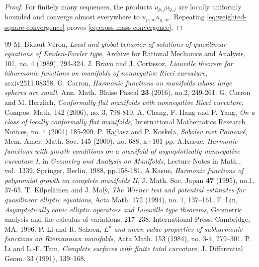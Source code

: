 \documentclass[10pt,a4paper]{amsart}
\numberwithin{equation}{section}
\begin{document}
\begin{proof}
For finitely many sequences, the products
$u_{p,j}u_{q,j}$ are locally uniformly bounded and converge almost
everywhere to $u_{p,\infty}u_{q,\infty}$.  Repeating
\cref{eq:weighted-square-convergence} proves
\cref{eq:cross-mass-convergence}.

\end{proof}


\begin{thebibliography}{99}
 M. Bidaut-V{\'e}ron, \emph{Local and global behavior of solutions of quasilinear equations of Emden-Fowler type}, Archive for Rational Mechanics and Analysis, 107, no. 4 (1989), 293-324.
 J. Bravo and J. Cortissoz, \emph{Liouville theorem for biharmonic functions on manifolds of nonnegative Ricci curvature}, arxiv2511.08358.
 G. Carron, \emph{Harmonic functions on manifolds whose large spheres are small}, Ann. Math. Blaise Pascal \textbf{23} (2016), no.2, 249-261.
 G. Carron and M. Herzlich, \textit{Conformally flat manifolds with nonnegative Ricci curvature}, Compos. Math. 142 (2006), no. 3, 798-810.
 A. Chang, F. Hang and P. Yang, \emph{On a class of locally conformally flat manifolds}, International Mathematics Research Notices, no. 4 (2004) 185-209.
 P. Hajłasz and P. Koskela, \emph{Sobolev met Poincar\'e}, Mem. Amer. Math. Soc. 145 (2000), no. 688, x+101 pp.
 A.Kasue, \emph{Harmonic functions with growth conditions on a manifold of asymptotically nonnegative curvature I}, in \emph{Geometry and Analysis on Manifolds}, Lecture Notes in Math., vol.~1339, Springer, Berlin, 1988, pp.158-181.
 A.Kasue, \emph{Harmonic functions of polynomial growth on complete manifolds II}, J. Math. Soc. Japan \textbf{47} (1995), no.1, 37-65.
 T. Kilpel{\"a}inen and J. Mal{\`y}, \emph{The Wiener test and potential estimates for quasilinear elliptic equations}, Acta Math. 172 (1994), no. 1, 137–161.
 F. Lin, \emph{Asymptotically conic elliptic operators and Liouville type theorems}, Geometric analysis and the calculus of variations, 217–238. International Press, Cambridge, MA, 1996.
 P. Li and R. Schoen, \emph{$L^p$ and mean value properties of subharmonic functions on Riemannian manifolds}, Acta Math. 153 (1984), no. 3-4, 279–301.
 P. Li and L.-F. Tam, \emph{Complete surfaces with finite total curvature}, J. Differential Geom. 33 (1991), 139–168.

\end{thebibliography}
\end{document}
